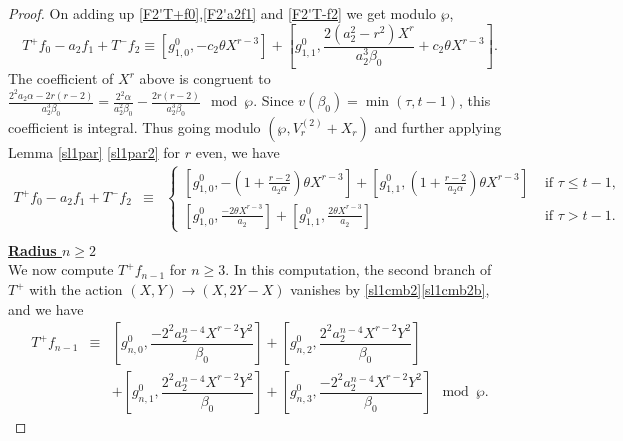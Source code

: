 \documentclass[10pt,a4paper]{amsart}
\begin{document}
\begin{proof}
On adding up \eqref{F2'T+f0},\eqref{F2'a2f1} and \eqref{F2'T-f2} we get modulo $\wp$,
\begin{equation*}
  T^{+}f_{0}-a_{2}f_{1}+T^{-}f_{2}\equiv \left[g_{1,0}^{0}, -c_{2}\theta X^{r-3}\right] + \left[g_{1,1}^{0}, \dfrac{2(a_{2}^2-r^2)X^{r}}{a_{2}^3\beta_{0}}+ c_{2}\theta X^{r-3} \right].
    \end{equation*}
     The coefficient of $X^{r}$ above is congruent to $\frac{2^2a_{2}\alpha-2r(r-2)}{a_{2}^3\beta_{0}} = \frac{2^2\alpha}{a_{2}^2\beta_{0}}-\frac{2r(r-2)}{a_{2}^3\beta_{0}} \mod \wp$. Since $v(\beta_{0})= \min(\tau,t-1)$, this coefficient is integral. Thus going modulo $(\wp,V_{r}^{(2)}+X_{r})$ and further applying  Lemma \ref{sl1par} \eqref{sl1par2} for $r$  even, we have 
    \begin{eqnarray}\label{sl1F2'rad1}
   T^{+}f_{0}-a_{2}f_{1}+T^{-}f_{2}
    &\equiv &\begin{cases} 
    \left[g_{1,0}^{0}, -\left(1+\frac{r-2}{a_{2}\alpha} \right)\theta X^{r-3}\right] + \left[g_{1,1}^{0}, \left(1+\frac{r-2}{a_{2}\alpha}\right)\theta X^{r-3} \right] & \text{ if } \tau\leq t-1,\\
     \left[g_{1,0}^{0}, \frac{-2\theta X^{r-3}}{a_{2}}\right] + \left[g_{1,1}^{0}, \frac{2\theta X^{r-3}}{a_{2}}\right]  &\text{ if } \tau>t-1.
     \end{cases}\nonumber\\
     &&
     \end{eqnarray}
\noindent\underline{\textbf{Radius $n\geq 2$}}\\
We now compute $T^{+}f_{n-1}$ for $n\geq 3.$ In  this computation, the second branch of $T^{+}$ with the action $(X,Y)\to(X,2Y-X)$ vanishes  by \ref{sl1cmb2}\eqref{sl1cmb2b}, and we have
\begin{eqnarray}\label{F2'T+fn-1}
  T^{+}f_{n-1} &\equiv& \left[g_{n,0}^{0}, \dfrac{-2^2a_{2}^{n-4}X^{r-2}Y^2}{\beta_{0}}\right] +\left[g_{n,2}^{0}, \dfrac{2^2a_{2}^{n-4}X^{r-2}Y^2}{\beta_{0}}\right]\nonumber\\
  &&+\left[g_{n,1}^{0}, \dfrac{2^2a_{2}^{n-4}X^{r-2}Y^2}{\beta_{0}}\right] +\left[g_{n,3}^{0}, \dfrac{-2^2a_{2}^{n-4}X^{r-2}Y^2}{\beta_{0}}\right] \mod\wp.
\end{eqnarray}
%


\end{proof}
\end{document}
